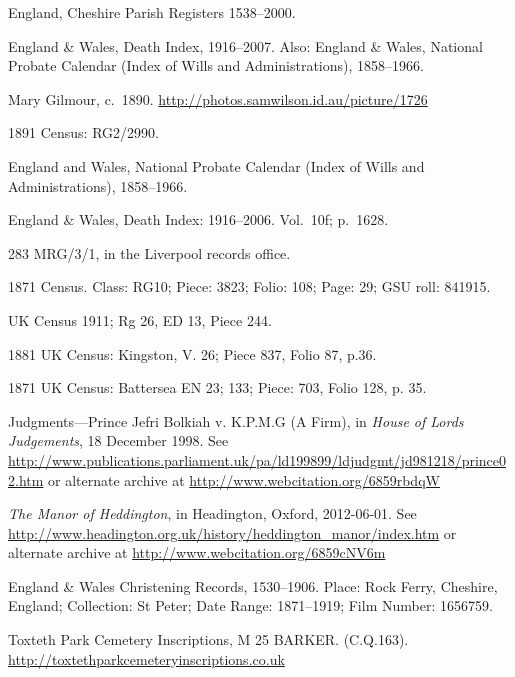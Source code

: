 \begin{thebibliography}{99}
\footnotesize

	England, Cheshire Parish Registers 1538--2000.

	England \& Wales, Death Index, 1916--2007.
	Also: England \& Wales, National Probate Calendar (Index of Wills and Administrations), 1858--1966.

	Mary Gilmour, c.~1890.
	\url{http://photos.samwilson.id.au/picture/1726}

	1891 Census: RG2/2990.

	England and Wales, National Probate Calendar (Index of Wills and Administrations), 1858--1966.

	England \& Wales, Death Index: 1916--2006. Vol.~10f; p.~1628.

	283 MRG/3/1, in the Liverpool records office.

	1871 Census. Class: RG10; Piece: 3823; Folio: 108; Page: 29; GSU roll: 841915.

	UK Census 1911; Rg 26, ED 13, Piece 244.

	1881 UK Census: Kingston, V. 26; Piece 837, Folio 87, p.36.

	1871 UK Census: Battersea EN 23; 133; Piece: 703, Folio 128, p. 35.

	Judgments---Prince Jefri Bolkiah v. K.P.M.G (A Firm), in \emph{House of Lords Judgements}, 18 December 1998.
	See \url{http://www.publications.parliament.uk/pa/ld199899/ldjudgmt/jd981218/prince02.htm}
	or alternate archive at \url{http://www.webcitation.org/6859rbdqW}

	\emph{The Manor of Heddington}, in Headington, Oxford, 2012-06-01.
	See \url{http://www.headington.org.uk/history/heddington_manor/index.htm} or alternate archive at \url{http://www.webcitation.org/6859cNV6m}

	England \& Wales Christening Records, 1530--1906.
	Place: Rock Ferry, Cheshire, England; Collection: St Peter; Date Range: 1871--1919; Film Number: 1656759.

	Toxteth Park Cemetery Inscriptions, M 25 BARKER. (C.Q.163). \url{http://toxtethparkcemeteryinscriptions.co.uk}


\end{thebibliography}

